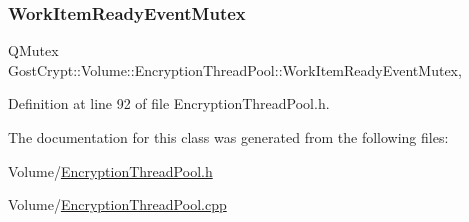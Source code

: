 \subsubsection{\texorpdfstring{Work\+Item\+Ready\+Event\+Mutex}{WorkItemReadyEventMutex}}
{\footnotesize\ttfamily Q\+Mutex Gost\+Crypt\+::\+Volume\+::\+Encryption\+Thread\+Pool\+::\+Work\+Item\+Ready\+Event\+Mutex\hspace{0.3cm}{\ttfamily [static]}, {\ttfamily [protected]}}



Definition at line 92 of file Encryption\+Thread\+Pool.\+h.



The documentation for this class was generated from the following files\+:\begin{DoxyCompactItemize}
\item 
Volume/\hyperlink{_encryption_thread_pool_8h}{Encryption\+Thread\+Pool.\+h}\item 
Volume/\hyperlink{_encryption_thread_pool_8cpp}{Encryption\+Thread\+Pool.\+cpp}\end{DoxyCompactItemize}
